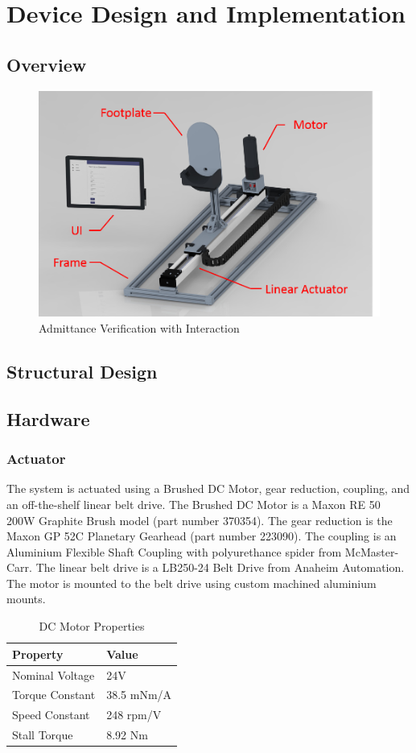 \documentclass[12pt]{report}
\begin{document}
\chapter{Device Design and Implementation}
	\section{Overview}

	\begin{figure}[t] 
		\centering
		\includegraphics[width=0.75\linewidth]{Robot_labeled}
		\caption{Admittance Verification with Interaction}
		\label{fig:VerInt}
	\end{figure}
	
	\section{Structural Design}

	\section{Hardware}
		\subsection{Actuator}
		
	The system is actuated using a Brushed DC Motor, gear reduction, coupling, and an off-the-shelf linear belt drive. The Brushed DC Motor is a Maxon RE 50 200W Graphite Brush model (part number 370354). The gear reduction is the Maxon GP 52C Planetary Gearhead (part number 223090). The coupling is an Aluminium Flexible Shaft Coupling with polyurethance spider from McMaster-Carr. The linear belt drive is a LB250-24 Belt Drive from Anaheim Automation. The motor is mounted to the belt drive using custom machined aluminium mounts. 
	
	\begin{table}[]
	\centering
	\caption{DC Motor Properties}	
	\begin{tabular}{|l|l|}
		\hline
		\textbf{Property} & \textbf{Value}  \\ \hline
 		Nominal Voltage & 24V  \\ \hline
 		Torque Constant & 38.5 mNm/A \\ \hline
 		Speed Constant & 248 rpm/V  \\ \hline
 		Stall Torque & 8.92 Nm \\ \hline
		\end{tabular}
	\label{tab:motor}
	\end{table}
	
\end{document}
